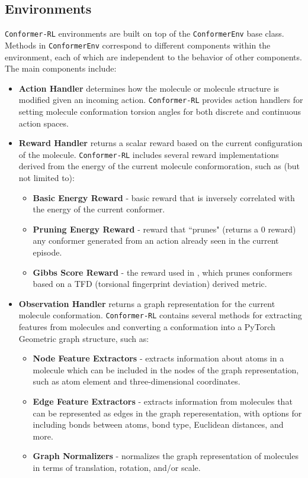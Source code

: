 \documentclass[twoside,11pt]{article}
\newcommand{\code}[1]{\texttt{#1}}
\newcommand{\titleofpaper}{Conformer-RL}
\newcommand{\genComment}[2]{\ifnum\comments=1{\color{#1}{\textsf{\footnotesize #2}}}\fi}
\newcommand{\tarun}[1] {\genComment{blue}{[TG: #1]}}
\begin{document}
\subsection{Environments}
\code{\titleofpaper} environments are built on top of the \code{ConformerEnv} base class. Methods in \code{ConformerEnv} correspond to different components within the environment, each of which are independent to the behavior of other components. The main components include:
\begin{itemize}
  \item \textbf{Action Handler} determines how the molecule or molecule structure is modified given an incoming action. \code{\titleofpaper} provides action handlers for setting molecule conformation torsion angles for both discrete and continuous action spaces.
  
  \item \textbf{Reward Handler} returns a scalar reward based on the current configuration of the molecule. \code{\titleofpaper} includes several reward implementations derived from the energy of the current molecule conformoration, such as (but not limited to):
  \begin{itemize}
    \item \textbf{Basic Energy Reward} - basic reward that is inversely correlated with the energy of the current conformer.
    \item \textbf{Pruning Energy Reward} - reward that ``prunes" (returns a 0 reward) any conformer generated from an action already seen in the current episode.
    \item \textbf{Gibbs Score Reward} - the reward used in \citet{gogineni2020torsionnet}, which prunes conformers based on a TFD (torsional fingerprint deviation) derived metric.
  \end{itemize}

  \item \textbf{Observation Handler} returns a graph representation for the current molecule conformation. \code{\titleofpaper} contains several methods for extracting features from molecules and converting a conformation into a PyTorch Geometric graph structure, such as:
  \begin{itemize}
    \item \textbf{Node Feature Extractors} - extracts information about atoms in a molecule which can be included in the nodes of the graph representation, such as atom element and three-dimensional coordinates.
    \item \textbf{Edge Feature Extractors} - extracts information from molecules that can be represented as edges in the graph reperesentation, with options for including bonds between atoms, bond type, Euclidean distances, and more.
    \item \textbf{Graph Normalizers} - normalizes the graph representation of molecules in terms of translation, rotation, and/or scale.
  \end{itemize}

\end{itemize}
\end{document}

